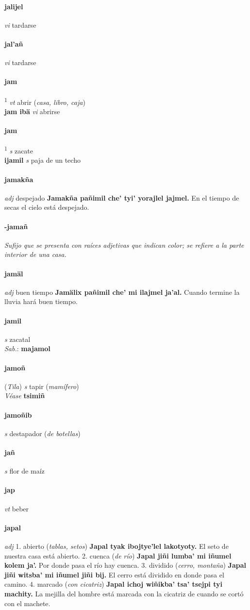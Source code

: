 \documentclass{scrbook}
\newcommand{\entry}[1]{\paragraph{#1}}
\newcommand{\onedefinition}[1]{#1.}
\newcommand{\defsuperscript}[1]{\textsuperscript{1}}
\newcommand{\nontranslationdef}[1]{\textit{#1}}
\newcommand{\partofspeech}[1]{\textit{#1}}
\newcommand{\spanishtranslation}[1]{#1}
\newcommand{\clarification}[1]{(\textit{#1})}
\newcommand{\cholexample}[1]{\textbf{#1}}
\newcommand{\exampletranslation}[1]{#1}
\newcommand{\dialectvariant}[1]{\\\textit{#1}:}
\newcommand{\dialectword}[1]{\textbf{#1}}
\newcommand{\alsosee}[1]{\\\textit{Véase} \textbf{#1}}
\newcommand{\relevantdialect}[1]{(\textit{#1})}
\newcommand{\secondaryentry}[1]{\\\textbf{#1}}
\newcommand{\secondpartofspeech}[1]{\textit{#1}}
\newcommand{\secondtranslation}[1]{#1}
\begin{document}
\begin{multicols}{2}
\entry{jalijel}
\partofspeech{vi}
\spanishtranslation{tardarse}

\entry{jal'añ}
\partofspeech{vi}
\spanishtranslation{tardarse}

\entry{jam}
\defsuperscript{1}
\partofspeech{vt}
\spanishtranslation{abrir}
\clarification{casa, libro, caja}
\secondaryentry{jam ibä}
\secondpartofspeech{vi}
\secondtranslation{abrirse}

\entry{jam}
\defsuperscript{2}
\partofspeech{s}
\spanishtranslation{zacate}
\secondaryentry{ijamil}
\secondpartofspeech{s}
\secondtranslation{paja de un techo}

\entry{jamakña}
\partofspeech{adj}
\spanishtranslation{despejado}
\cholexample{Jamakña pañimil che' tyi' yorajlel jajmel.}
\exampletranslation{En el tiempo de secas el cielo está despejado.}

\entry{-jamañ}
\nontranslationdef{Sufijo que se presenta con raíces adjetivas que indican color; se refiere a la parte interior de una casa.}

\entry{jamäl}
\partofspeech{adj}
\spanishtranslation{buen tiempo}
\cholexample{Jamälix pañimil che' mi ilajmel ja'al.}
\exampletranslation{Cuando termine la lluvia hará buen tiempo.}

\entry{jamil}
\partofspeech{s}
\spanishtranslation{zacatal}
\dialectvariant{Sab.}
\dialectword{majamol}

\entry{jamoñ}
\relevantdialect{Tila}
\partofspeech{s}
\spanishtranslation{tapir}
\clarification{mamífero}
\alsosee{tsimiñ}

\entry{jamoñib}
\partofspeech{s}
\spanishtranslation{destapador}
\clarification{de botellas}

\entry{jañ}
\partofspeech{s}
\spanishtranslation{flor de maíz}

\entry{jap}
\partofspeech{vt}
\spanishtranslation{beber}

\entry{japal}
\partofspeech{adj}
\onedefinition{1}
\spanishtranslation{abierto}
\clarification{tablas, setos}
\cholexample{Japal tyak ibojtye'lel lakotyoty.}
\exampletranslation{El seto de nuestra casa está abierto.}
\onedefinition{2}
\spanishtranslation{cuenca}
\clarification{de río}
\cholexample{Japal jiñi lumba' mi iñumel kolem ja'.}
\exampletranslation{Por donde pasa el río hay cuenca.}
\onedefinition{3}
\spanishtranslation{dividido}
\clarification{cerro, montaña}
\cholexample{Japal jiñi witsba' mi iñumel jiñi bij.}
\exampletranslation{El cerro está dividido en donde pasa el camino.}
\onedefinition{4}
\spanishtranslation{marcado}
\clarification{con cicatriz}
\cholexample{Japal ichoj wiñikba' tsa' tsejpi tyi machity.}
\exampletranslation{La mejilla del hombre está marcada con la cicatriz de cuando se cortó con el machete.}


\end{multicols}
\end{document}
